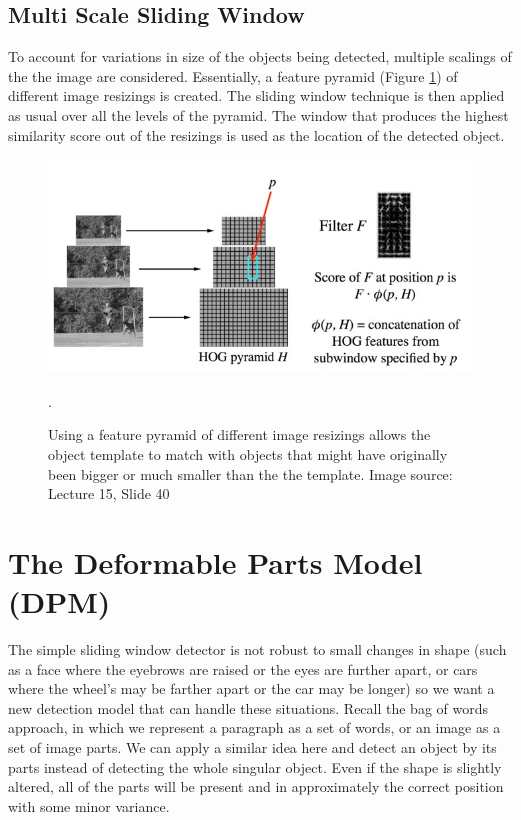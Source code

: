 \documentclass{article}
\begin{document}
\subsection{Multi Scale Sliding Window}
To account for variations in size of the objects being detected, multiple scalings of the the image are considered. Essentially, a feature pyramid (Figure \ref{fig:feature_pyramid}) of different image resizings is created. The sliding window technique is then applied as usual over all the levels of the pyramid. The window that produces the highest similarity score out of the resizings is used as the location of the detected object.

\begin{figure}[h]
	\includegraphics[width=\linewidth]{feature_pyramid.jpg}
	\caption{Using a feature pyramid of different image resizings allows the object template to match with objects that might have originally been bigger or much smaller than the the template. Image source: Lecture 15, Slide 40}.
    \label{fig:feature_pyramid}
\end{figure}

\section{The Deformable Parts Model (DPM)}
The simple sliding window detector is not robust to small changes in shape
(such as a face where the eyebrows are raised or the eyes are further apart, or cars
where the wheel's may be farther apart or the car may be longer) so we
want a new detection model that can handle these situations. Recall the
bag of words approach, in which we represent a paragraph as a set of words, or
an image as a set of image parts. We can apply a similar idea here and detect an
object by its parts instead of detecting the whole singular object. 
Even if the shape is
slightly altered, all of the parts will be present and in approximately the correct
position with some minor variance.\\
\end{document}
